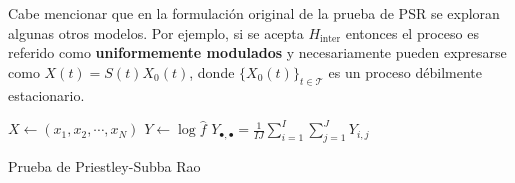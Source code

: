 Cabe mencionar que en la formulación original de la prueba de PSR se exploran algunas otros 
modelos. 
%
Por ejemplo, si se acepta $H_{\text{inter}}$ entonces el proceso es referido como
\textbf{uniformemente modulados} y necesariamente pueden expresarse como $X(t) = S(t) X_0(t)$, 
donde $\{X_0(t)\}_{t\in \mathcal{T}}$ es un proceso débilmente estacionario.

\begin{algorithm}
\DontPrintSemicolon
{}

$ X \leftarrow \left(x_1, x_2, \cdots, x_N \right)$\;
$Y \leftarrow \log{\widehat{f}}$\;
$Y_{\bullet,\bullet} = \frac{1}{I J} \sum_{i=1}^{I} \sum_{j=1}^{J} Y_{i,j}$ \;

\caption{Prueba de Priestley-Subba Rao}
\label{algoritmo_stationarity}
\end{algorithm}

